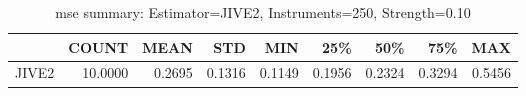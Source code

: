 \begin{table}[ht]
\centering
\caption{mse summary: Estimator=JIVE2, Instruments=250, Strength=0.10}
\begin{tabular}{lrrrrrrrr}
\toprule
 & COUNT & MEAN & STD & MIN & 25\% & 50\% & 75\% & MAX \\
\midrule
JIVE2 & 10.0000 & 0.2695 & 0.1316 & 0.1149 & 0.1956 & 0.2324 & 0.3294 & 0.5456 \\
\bottomrule
\end{tabular}
\end{table}
